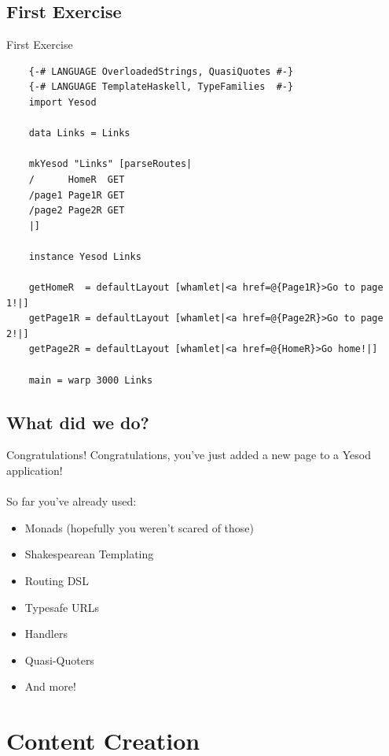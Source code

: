 \documentclass[pdf]{beamer}
\begin{document}
\subsection{First Exercise}
\begin{frame}[fragile]{First Exercise}
  \begin{verbatim}
    {-# LANGUAGE OverloadedStrings, QuasiQuotes #-}
    {-# LANGUAGE TemplateHaskell, TypeFamilies  #-}
    import Yesod

    data Links = Links

    mkYesod "Links" [parseRoutes|
    /      HomeR  GET
    /page1 Page1R GET
    /page2 Page2R GET
    |]

    instance Yesod Links

    getHomeR  = defaultLayout [whamlet|<a href=@{Page1R}>Go to page 1!|]
    getPage1R = defaultLayout [whamlet|<a href=@{Page2R}>Go to page 2!|]
    getPage2R = defaultLayout [whamlet|<a href=@{HomeR}>Go home!|]

    main = warp 3000 Links
  \end{verbatim}
\end{frame}

\subsection{What did we do?}

\begin{frame}{Congratulations!}
  Congratulations, you've just added a new page to a Yesod application!\\
  \\
  So far you've already used:\\
  \begin{itemize}
  \item Monads (hopefully you weren't scared of those)
  \item Shakespearean Templating
  \item Routing DSL
  \item Typesafe URLs
  \item Handlers
  \item Quasi-Quoters
  \item And more!
  \end{itemize}
\end{frame}

\section{Content Creation}
\end{document}
